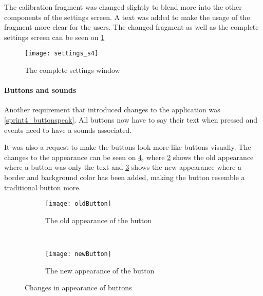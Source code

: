 The calibration fragment was changed slightly to blend more into the other components of the settings screen. 
A text was added to make the usage of the fragment more clear for the users.
The changed fragment as well as the complete settings screen can be seen on \cref{settings_s4}

\begin{figure}
\texttt{[image: settings\_s4]}
\caption{The complete settings window}
\label{settings_s4}
\end{figure}

\paragraph{Buttons and sounds}
Another requirement that introduced changes to the application was \cref{sprint4_buttonspeak}.
All buttons now have to say their text when pressed and events need to have a sounds associated.

It was also a request to make the buttons look more like buttons visually.
The changes to the appearance can be seen on \cref{Buttons}, where \cref{old} shows the old appearance where a button was only the text and \cref{new} shows the new appearance where a border and background color has been added, making the button resemble a traditional button more.

\begin{figure}
\begin{subfigure}{0.5\textwidth}
\centering
\texttt{[image: oldButton]}
\caption{The old appearance of the button}
\label{old}
\end{subfigure}
~
\begin{subfigure}{0.5\textwidth}
\centering
\texttt{[image: newButton]}
\caption{The new appearance of the button}
\label{new}
\end{subfigure}
\caption{Changes in appearance of buttons}
\label{Buttons}
\end{figure}
